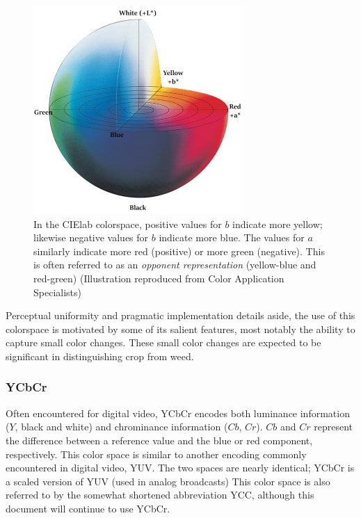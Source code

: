\documentclass[letterpaper]{article}
\begin{document}
{\begin{figure}[H]
	\centering
	\includegraphics[width=.35\linewidth]{./figures/cielab-colorspace.jpg}
	\caption[CIElab colorspace]{In the CIElab colorspace, positive values for $b$ indicate more yellow; likewise negative values for $b$ indicate more blue. The values for $a$ similarly indicate more red (positive) or more green (negative). This is often referred to as an \textit{opponent representation} (yellow-blue and red-green) (Illustration reproduced from Color Application Specialists)}
	\label{fig:cielab}	
\end{figure}

Perceptual uniformity and pragmatic implementation details aside, the use of this colorspace is motivated by some of its salient features, most notably the ability to capture small color changes. These small color changes are expected to be significant in distinguishing crop from weed.

\subsubsection{YCbCr}
Often encountered for digital video, YCbCr encodes both luminance information ($Y$, black and white) and chrominance information ($Cb$, $Cr$). $Cb$ and $Cr$ represent the difference between a reference value and the blue or red component, respectively. This color space is similar to another encoding commonly encountered in digital video, YUV. The two spaces are nearly identical; YCbCr is a scaled version of YUV (used in analog broadcasts) This color space is also referred to by the somewhat shortened abbreviation YCC, although this document will continue to use YCbCr.

}
\end{document}
